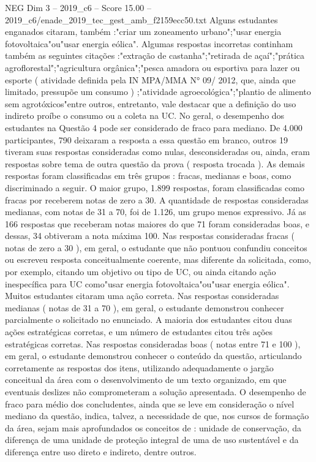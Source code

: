\begin{textsample}{NEG Dim 3 – 2019\_c6 – Score 15.00 – 2019\_c6/enade\_2019\_tec\_gest\_amb\_f2159ecc50.txt}
Alguns estudantes enganados citaram, também :"criar um zoneamento urbano";"usar energia fotovoltaica"ou"usar energia eólica".
Algumas respostas incorretas continham também as seguintes citações :"extração de castanha";"retirada de açaí";"prática agroflorestal";"agricultura orgânica";"pesca amadora ou esportiva para lazer ou esporte ( atividade definida pela IN MPA/MMA N{\EmojiFont °} 09/ 2012, que, ainda que limitado, pressupõe um consumo ) ;"atividade agroecológica";"plantio de alimento sem agrotóxicos"entre outros, entretanto, vale destacar que a definição do uso indireto proíbe o consumo ou a coleta na UC.
No geral, o desempenho dos estudantes na Questão 4 pode ser considerado de fraco para mediano.
De 4.000 participantes, 790 deixaram a resposta a essa questão em branco, outros 19 tiveram suas respostas consideradas como nulas, desconsideradas ou, ainda, eram respostas sobre tema de outra questão da prova ( resposta trocada ).
As demais respostas foram classificadas em três grupos : fracas, medianas e boas, como discriminado a seguir.
O maior grupo, 1.899 respostas, foram classificadas como fracas por receberem notas de zero a 30.
A quantidade de respostas consideradas medianas, com notas de 31 a 70, foi de 1.126, um grupo menos expressivo.
Já as 166 respostas que receberam notas maiores do que 71 foram consideradas boas, e dessas, 34 obtiveram a nota máxima 100.
Nas respostas consideradas fracas ( notas de zero a 30 ), em geral, o estudante que não pontuou confundiu conceitos ou escreveu resposta conceitualmente coerente, mas diferente da solicitada, como, por exemplo, citando um objetivo ou tipo de UC, ou ainda citando ação inespecífica para UC como"usar energia fotovoltaica"ou"usar energia eólica".
Muitos estudantes citaram uma ação correta.
Nas respostas consideradas medianas ( notas de 31 a 70 ), em geral, o estudante demonstrou conhecer parcialmente o solicitado no enunciado.
A maioria dos estudantes citou duas ações estratégicas corretas, e um número de estudantes citou três ações estratégicas corretas.
Nas respostas consideradas boas ( notas entre 71 e 100 ), em geral, o estudante demonstrou conhecer o conteúdo da questão, articulando corretamente as respostas dos itens, utilizando adequadamente o jargão conceitual da área com o desenvolvimento de um texto organizado, em que eventuais deslizes não comprometeram a solução apresentada.
O desempenho de fraco para médio dos concludentes, ainda que se leve em consideração o nível mediano da questão, indica, talvez, a necessidade de que, nos cursos de formação da área, sejam mais aprofundados os conceitos de : unidade de conservação, da diferença de uma unidade de proteção integral de uma de uso sustentável e da diferença entre uso direto e indireto, dentre outros.

\end{textsample}
